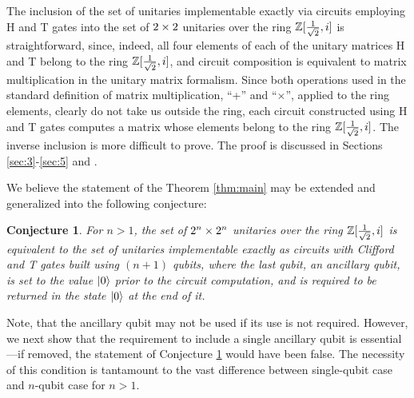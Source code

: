 \documentclass[english,journal]{extarticle}
\theoremstyle{plain}
\providecommand{\cnjname}{Conjecture}
\theoremstyle{plain}
\newtheorem{cnj}{\protect\cnjname}
\theoremstyle{plain}
\theoremstyle{definition}
\theoremstyle{plain}
\theoremstyle{plain}
\begin{document}
The inclusion of the set
of unitaries implementable exactly 
via circuits employing H and T gates into the set of $2\times 2$ unitaries over the ring $\mathbb{Z}[\frac{1}{\sqrt{2}},i]$ is straightforward, since, indeed, all four
elements of each of the unitary matrices 
H and T belong to the ring $\mathbb{Z}[\frac{1}{\sqrt{2}},i]$, and circuit composition is equivalent to matrix
multiplication in the unitary matrix 
formalism.  Since both operations used in the standard definition of matrix
multiplication, ``+'' and ``$\times$'', applied to the ring elements, clearly do
not take us outside the ring, each circuit constructed using H and T gates computes a matrix
whose elements belong to the ring $\mathbb{Z}[\frac{1}{\sqrt{2}},i]$.  The inverse inclusion is more
difficult to prove.  The proof is discussed in Sections \ref{sec:3}-\ref{sec:5} and
.

We believe the statement of the Theorem \ref{thm:main} may be extended and
generalized into the following conjecture:
\begin{cnj} \label{cnj:main}
For $n>1$, the set of $2^n\times 2^n$ unitaries over the ring $\mathbb{Z}[\frac{1}{\sqrt{2}},i]$ is equivalent to
the set of unitaries implementable exactly as circuits with 
Clifford and T gates built using $(n+1)$ qubits, where the last qubit, an
ancillary qubit, is set to the value $\left|0\right\rangle$ prior to the circuit computation, and is
required to 
be returned in the state $\left|0\right\rangle$ at the end of it. 
\end{cnj}

Note, that the ancillary qubit may not be used if its use is not required.  
However, we next show that the requirement to include a single ancillary qubit
is essential---if removed, the statement of Conjecture \ref{cnj:main} would have
been false.  
The necessity of this condition is tantamount to the vast difference between
single-qubit case and $n$-qubit case for $n>1$.
\end{document}
